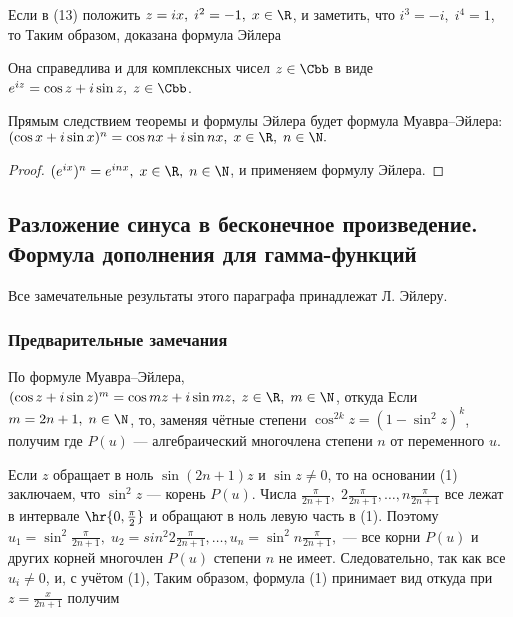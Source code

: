 \documentclass[a4paper]{article}
\begin{document}
Если в (13) положить $z=ix, \; i^2=-1, \; x\in\R$, и заметить, что
$i^3=-i, \; i^4=1$, то 
Таким образом, доказана формула Эйлера 

Она справедлива и для комплексных чисел $z\in\Cbb$ в виде $e^{iz} =
\cos z + i\sin z, \; z\in\Cbb$.

Прямым следствием теоремы и формулы Эйлера будет формула
Муавра--Эйлера: $(\cos x + i\sin x)^n = \cos{nx} + i\sin{nx}, \;
x\in\R, \; n\in\N.$

\begin{proof}
$(e^{ix})^n = e^{inx}, \; x\in\R, \; n\in\N$, и применяем формулу
Эйлера.
\end{proof}

\subsection{Разложение синуса в бесконечное произведение. Формула
дополнения для гамма-функций}

Все замечательные результаты этого параграфа принадлежат Л. Эйлеру.

\subsubsection{Предварительные замечания}

По формуле Муавра--Эйлера, $(\cos z + i\sin z)^m = \cos{mz} +
i\sin{mz}, \; z\in\R, \; m\in\N$, откуда  Если $m=2n+1, \; n\in\N$, то, заменяя
чётные степени $\cos^{2k}z = (1-\sin^2 z)^k$, получим
 где $P(u)$ ---
алгебраический многочлена степени $n$ от переменного $u$.

Если $z$ обращает в ноль $\sin(2n+1)z$ и $\sin z\ne0$, то на
основании (1) заключаем, что $\sin^2 z$ --- корень $P(u)$. Числа
$\frac{\pi}{2n+1}, \; 2 \frac{\pi}{2n+1}, \ldots, n
\frac{\pi}{2n+1}$ все лежат в интервале $\hr{0,\frac{\pi}2}$ и
обращают в ноль левую часть в (1). Поэтому $u_1 = \sin^2
\frac{\pi}{2n+1}, \; u_2 = sin^2 2\frac{\pi}{2n+1}, \ldots, u_n =
\sin^2 n \frac{\pi}{2n+1},$ --- все корни $P(u)$ и других корней
многочлен $P(u)$ степени $n$ не имеет. Следовательно,  так как все $u_i\ne0$, и, с учётом (1),
 Таким
образом, формула (1) принимает вид  откуда при $z =
\frac{x}{2n+1}$ получим 
\end{document}
